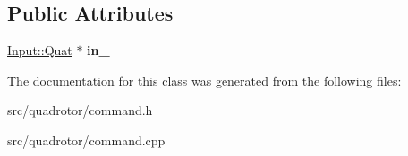 \subsection*{\-Public \-Attributes}
\begin{DoxyCompactItemize}
\item 
\hypertarget{classCommand_1_1Q_a01f5997c671688955fc024b845ab9689}{\hyperlink{classInput_1_1Quat}{\-Input\-::\-Quat} $\ast$ {\bfseries in\-\_\-}}\label{classCommand_1_1Q_a01f5997c671688955fc024b845ab9689}

\end{DoxyCompactItemize}


\-The documentation for this class was generated from the following files\-:\begin{DoxyCompactItemize}
\item 
src/quadrotor/command.\-h\item 
src/quadrotor/command.\-cpp\end{DoxyCompactItemize}
